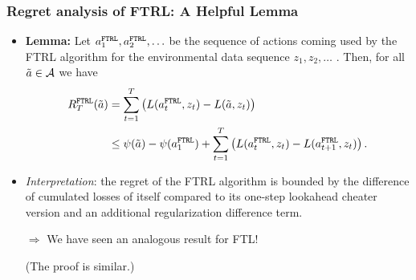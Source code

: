 \begin{frame} 
	\frametitle{Regret analysis of FTRL: A Helpful Lemma}
	\small
	\begin{itemize}
		\item \textbf{Lemma:}
		Let $a_1^{\texttt{FTRL}}, a_2^{\texttt{FTRL}}, \ldots$ be the sequence of actions coming used by the FTRL algorithm for the environmental data sequence $z_1,z_2,\ldots$ . 
		 Then, for all $\tilde a \in \mathcal{A}$ we have
		\begin{equation*}
			\begin{split}
				R_T^{\texttt{FTRL}}(\tilde a) &= \sum\limits_{t=1}^T \big(L(a_t^{\texttt{FTRL}},z_t) - L(\tilde a,z_t) \big)
				\\ &\leq \psi(\tilde a) - \psi(a_1^{\texttt{FTRL}}) +\sum\limits_{t=1}^T \left(L(a_t^{\texttt{FTRL}},z_t) - L(a_{t+1}^{\texttt{FTRL}},z_t)\right).
			\end{split}
		\end{equation*}
		  \item \emph{Interpretation}: the regret of the FTRL algorithm is bounded by the difference of cumulated losses of itself compared to its one-step lookahead cheater version and an additional regularization difference term. 
		  \item [$\Rightarrow$] We have seen an analogous result for FTL!
		  
		  {\tiny (The proof is similar.)}
	\end{itemize}
\end{frame}


